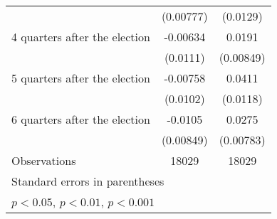 \begin{table}[htbp]
\begin{tabular}{l*{2}{c}}
                    &   (0.00777)         &    (0.0129)         \\
[1em]
 4 quarters after the election&    -0.00634         &      0.0191\sym{*}  \\
                    &    (0.0111)         &   (0.00849)         \\
[1em]
 5 quarters after the election&    -0.00758         &      0.0411\sym{***}\\
                    &    (0.0102)         &    (0.0118)         \\
[1em]
 6 quarters after the election&     -0.0105         &      0.0275\sym{***}\\
                    &   (0.00849)         &   (0.00783)         \\
\hline
Observations        &       18029         &       18029         \\
\hline\hline
\multicolumn{3}{l}{\footnotesize Standard errors in parentheses}\\
\multicolumn{3}{l}{\footnotesize \sym{*} \(p<0.05\), \sym{**} \(p<0.01\), \sym{***} \(p<0.001\)}\\
\end{tabular}
\end{table}
